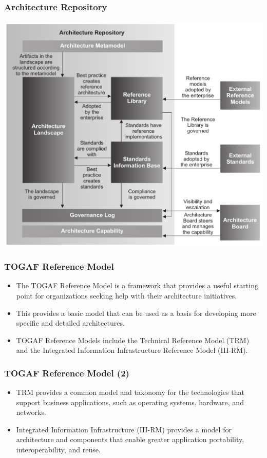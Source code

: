 \documentclass[aspectratio=169, table]{beamer}
\begin{document}
    {
        \begin{frame}
            \frametitle{Architecture Repository}
            \framesubtitle{\hspace{1cm}}
            \begin{center}
                \includegraphics[width=.65\textwidth]{../figures/architecture_repository}
            \end{center}
        \end{frame}
    }




    \begin{frame}
        \frametitle{TOGAF Reference Model}
        \begin{itemize}
            \item The TOGAF Reference Model is a framework that provides a useful starting point for organizations seeking help with their architecture initiatives.
            \item This provides a basic model that can be used as a basis for developing more specific and detailed architectures.
            \item TOGAF Reference Models include the Technical Reference Model (TRM) and the Integrated Information Infrastructure Reference Model (III-RM).

        \end{itemize}
    \end{frame}

    \begin{frame}
        \frametitle{TOGAF Reference Model (2)}
        \begin{itemize}
            \item TRM provides a common model and taxonomy for the technologies that support business applications, such as operating systems, hardware, and networks.
            \item Integrated Information Infrastructure (III-RM) provides a model for architecture and components that enable greater application portability, interoperability, and reuse.
        \end{itemize}
    \end{frame}
\end{document}
